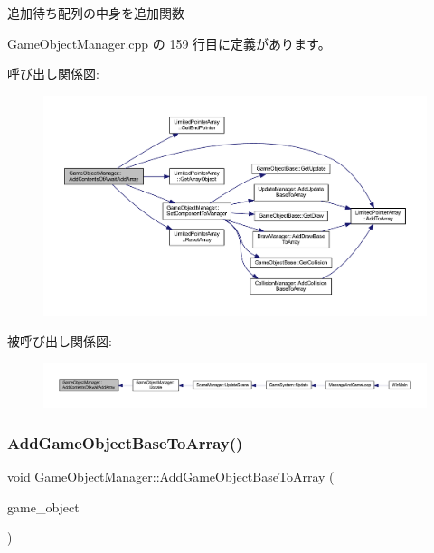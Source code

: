 追加待ち配列の中身を追加関数 



 Game\+Object\+Manager.\+cpp の 159 行目に定義があります。

呼び出し関係図\+:\nopagebreak
\begin{figure}[H]
\begin{center}
\leavevmode
\includegraphics[width=350pt]{class_game_object_manager_a783a9d55d566ab8c39e6ed86b3b52a09_cgraph}
\end{center}
\end{figure}
被呼び出し関係図\+:
\nopagebreak
\begin{figure}[H]
\begin{center}
\leavevmode
\includegraphics[width=350pt]{class_game_object_manager_a783a9d55d566ab8c39e6ed86b3b52a09_icgraph}
\end{center}
\end{figure}
\mbox{\label{class_game_object_manager_ab42e8ca2c7e586d05d513e8a868a86ef}} 
\subsubsection{\texorpdfstring{Add\+Game\+Object\+Base\+To\+Array()}{AddGameObjectBaseToArray()}}
{\footnotesize\ttfamily void Game\+Object\+Manager\+::\+Add\+Game\+Object\+Base\+To\+Array (\begin{DoxyParamCaption}\item[{\mbox{\hyperlink{class_game_object_base}{Game\+Object\+Base}} $\ast$}]{game\+\_\+object }\end{DoxyParamCaption})\hspace{0.3cm}{\ttfamily [static]}}



